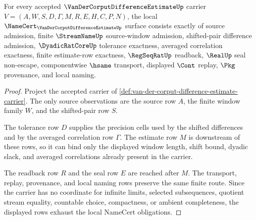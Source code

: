 \begin{theorem}
\label{thm:van-der-corput-difference-estimate-namecert-obligations}
For every accepted $\VanDerCorputDifferenceEstimateUp$ carrier $V=(A,W,S,D,\Gamma,M,R,E,H,C,P,N)$, the local $\NameCert_{\VanDerCorputDifferenceEstimateUp}$ surface consists exactly of source admission, finite $\StreamNameUp$ source-window admission, shifted-pair difference admission, $\DyadicRatCoreUp$ tolerance exactness, averaged correlation exactness, finite estimate-row exactness, $\RegSeqRatUp$ readback, $\RealUp$ seal non-escape, componentwise $\hsame$ transport, displayed $\Cont$ replay, $\Pkg$ provenance, and local naming.
\end{theorem}
\begin{proof}
Project the accepted carrier of \autoref{def:van-der-corput-difference-estimate-carrier}. The only source observations are the source row $A$, the finite window family $W$, and the shifted-pair row $S$.

The tolerance row $D$ supplies the precision cells used by the shifted differences and by the averaged correlation row $\Gamma$. The estimate row $M$ is downstream of these rows, so it can bind only the displayed window length, shift bound, dyadic slack, and averaged correlations already present in the carrier.

The readback row $R$ and the seal row $E$ are reached after $M$. The transport, replay, provenance, and local naming rows preserve the same finite route. Since the carrier has no coordinate for infinite limits, selected subsequences, quotient stream equality, countable choice, compactness, or ambient completeness, the displayed rows exhaust the local NameCert obligations.
\end{proof}

